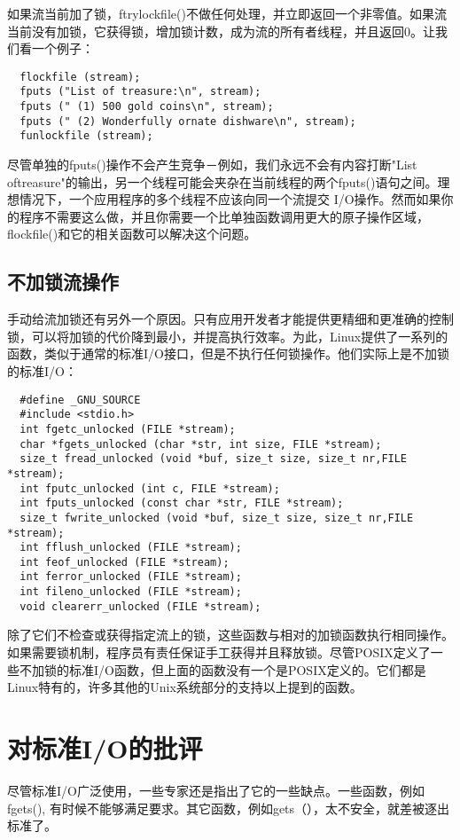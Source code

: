 如果流当前加了锁，ftrylockfile()不做任何处理，并立即返回一个非零值。如果流当前没有加锁，它获得锁，增加锁计数，成为流的所有者线程，并且返回0。让我们看一个例子：
\begin{lstlisting}
  flockfile (stream);
  fputs ("List of treasure:\n", stream);
  fputs (" (1) 500 gold coins\n", stream);
  fputs (" (2) Wonderfully ornate dishware\n", stream);
  funlockfile (stream);
\end{lstlisting}

尽管单独的fputs()操作不会产生竞争－例如，我们永远不会有内容打断"List oftreasure"的输出，另一个线程可能会夹杂在当前线程的两个fputs()语句之间。理想情况下，一个应用程序的多个线程不应该向同一个流提交 I/O操作。然而如果你的程序不需要这么做，并且你需要一个比单独函数调用更大的原子操作区域，flockfile()和它的相关函数可以解决这个问题。

\subsection{不加锁流操作}

手动给流加锁还有另外一个原因。只有应用开发者才能提供更精细和更准确的控制锁，可以将加锁的代价降到最小，并提高执行效率。为此，Linux提供了一系列的函数，类似于通常的标准I/O接口，但是不执行任何锁操作。他们实际上是不加锁的标准I/O：
\begin{lstlisting}
  #define _GNU_SOURCE
  #include <stdio.h>
  int fgetc_unlocked (FILE *stream);
  char *fgets_unlocked (char *str, int size, FILE *stream);
  size_t fread_unlocked (void *buf, size_t size, size_t nr,FILE *stream);
  int fputc_unlocked (int c, FILE *stream);
  int fputs_unlocked (const char *str, FILE *stream);
  size_t fwrite_unlocked (void *buf, size_t size, size_t nr,FILE *stream);
  int fflush_unlocked (FILE *stream);
  int feof_unlocked (FILE *stream);
  int ferror_unlocked (FILE *stream);
  int fileno_unlocked (FILE *stream);
  void clearerr_unlocked (FILE *stream);
\end{lstlisting}

除了它们不检查或获得指定流上的锁，这些函数与相对的加锁函数执行相同操作。如果需要锁机制，程序员有责任保证手工获得并且释放锁。尽管POSIX定义了一些不加锁的标准I/O函数，但上面的函数没有一个是POSIX定义的。它们都是Linux特有的，许多其他的Unix系统部分的支持以上提到的函数。 

\section{对标准I/O的批评}

尽管标准I/O广泛使用，一些专家还是指出了它的一些缺点。一些函数，例如fgets(), 有时候不能够满足要求。其它函数，例如gets（），太不安全，就差被逐出标准了。

